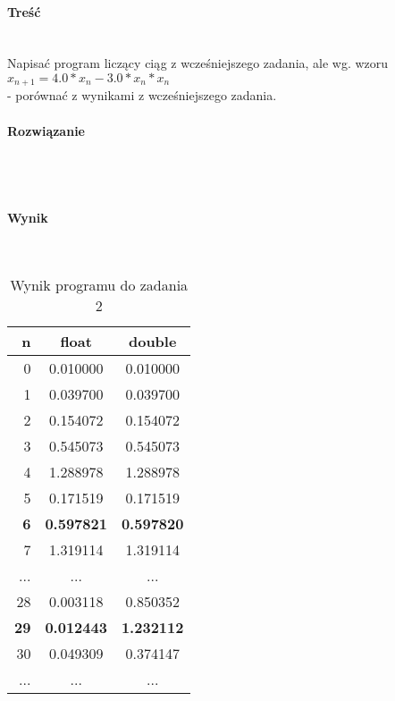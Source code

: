 \paragraph{Treść} ~\\
Napisać program liczący ciąg z wcześniejszego zadania, ale wg. wzoru \\
$ x_{n+1} = 4.0 * x_{n} - 3.0 * x_{n} * x_{n} $ \\
- porównać z wynikami z wcześniejszego zadania. \\

\paragraph{Rozwiązanie} ~\\
 ~\\

\paragraph{Wynik} ~\\
\begin{table}[h]
  \centering
  \begin{tabular}{r|c|c}
    n & float & double \\
    \hline 0 & 0.010000 & 0.010000 \\
    \hline 1 & 0.039700 & 0.039700 \\
    \hline 2 & 0.154072 & 0.154072 \\
    \hline 3 & 0.545073 & 0.545073 \\
    \hline 4 & 1.288978 & 1.288978 \\
    \hline 5 & 0.171519 & 0.171519 \\
    \hline \textbf{6} & \textbf{0.597821} & \textbf{0.597820} \\
    \hline 7 & 1.319114 & 1.319114 \\
    \hline ... & ... & ... \\
    \hline 28 & 0.003118 & 0.850352 \\
    \hline \textbf{29} & \textbf{0.012443} & \textbf{1.232112} \\
    \hline 30 & 0.049309 & 0.374147 \\
    \hline ... & ... & ... \\
    \hline
  \end{tabular}
  \caption{Wynik programu do zadania 2}
  \label{tab:WynikProgramuDoZadania2}
\end{table}

